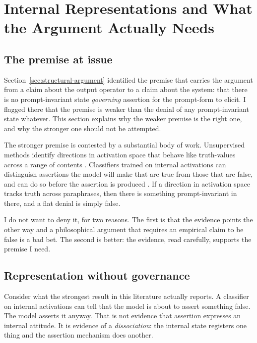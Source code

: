 \section{Internal Representations and What the Argument Actually Needs}
\label{sec:internal}

\subsection{The premise at issue}

Section~\ref{sec:structural-argument} identified the premise that carries the
argument from a claim about the output operator to a claim about the system:
that there is no prompt-invariant state \emph{governing} assertion for the
prompt-form to elicit. I flagged there that the premise is weaker than the
denial of any prompt-invariant state whatever. This section explains why the
weaker premise is the right one, and why the stronger one should not be
attempted.

The stronger premise is contested by a substantial body of work. Unsupervised
methods identify directions in activation space that behave like truth-values
across a range of contents \citep{burns2023}. Classifiers trained on internal
activations can distinguish assertions the model will make that are true from
those that are false, and can do so before the assertion is produced
\citep{azaria2023}. If a direction in activation space tracks truth across
paraphrases, then there is something prompt-invariant in there, and a flat denial
is simply false.

I do not want to deny it, for two reasons. The first is that the evidence points
the other way and a philosophical argument that requires an empirical claim to be
false is a bad bet. The second is better: the evidence, read carefully, supports
the premise I need.

\subsection{Representation without governance}
\label{sec:dissociation}

Consider what the strongest result in this literature actually reports. A
classifier on internal activations can tell that the model is about to assert
something false. The model asserts it anyway. That is not evidence that assertion
expresses an internal attitude. It is evidence of a \emph{dissociation}: the
internal state registers one thing and the assertion mechanism does another.

